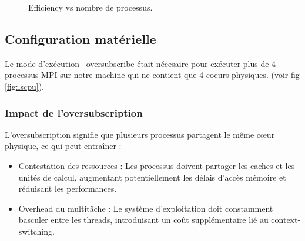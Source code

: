 \documentclass[a4paper,13pt]{book}
\begin{document}
\begin{figure}[ht]
  \centering
  \caption{Efficiency vs nombre de processus.}
  \label{fig:efficiency_vs_n}
\end{figure}

\clearpage
\subsection{Configuration matérielle }
Le mode d'exécution --oversubscribe était nécesaire pour exécuter plus de 4 processus MPI sur notre machine qui ne contient que 4 coeurs physiques. (voir fig \ref{fig:lscpu}).
\subsubsection{Impact de l'oversubscription}  L'oversubscription signifie que plusieurs processus partagent le même cœur physique, ce qui peut entraîner :
\begin{itemize}
  \item Contestation des ressources  : Les processus doivent partager les caches et les unités de calcul, augmentant potentiellement les délais d'accès mémoire et réduisant les performances.
  \item Overhead du multitâche  : Le système d'exploitation doit constamment basculer entre les threads, introduisant un coût supplémentaire lié au context-switching.
\end{itemize} 
\end{document}
